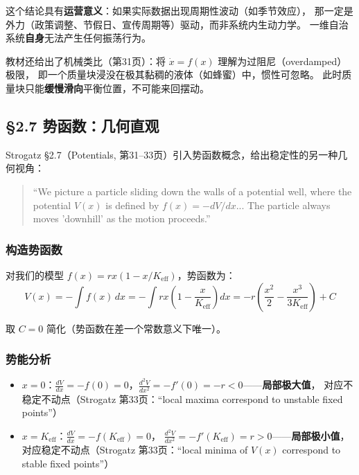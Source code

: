 \documentclass[12pt,a4paper]{article}
\begin{document}
这个结论具有\textbf{运营意义}：如果实际数据出现周期性波动（如季节效应），
那一定是外力（政策调整、节假日、宣传周期等）驱动，而非系统内生动力学。
一维自治系统\textbf{自身}无法产生任何振荡行为。

教材还给出了机械类比（第31页）：将 $\dot{x} = f(x)$ 理解为过阻尼（overdamped）极限，
即一个质量块浸没在极其黏稠的液体（如蜂蜜）中，惯性可忽略。
此时质量块只能\textbf{缓慢滑向}平衡位置，不可能来回摆动。

\subsection{\S2.7 势函数：几何直观}

Strogatz \S2.7（Potentials, 第31--33页）引入势函数概念，给出稳定性的另一种几何视角：

\begin{quote}
\small
``We picture a particle sliding down the walls of a potential well, where the potential $V(x)$
is defined by $f(x) = -dV/dx$... The particle always moves 'downhill' as the motion proceeds.''
\end{quote}

\subsubsection{构造势函数}
对我们的模型 $f(x) = r x(1 - x/K_{\text{eff}})$，势函数为：
\begin{equation}
V(x) = -\int f(x)\,dx
      = -\int r x\left(1 - \frac{x}{K_{\text{eff}}}\right) dx
      = -r\left(\frac{x^2}{2} - \frac{x^3}{3K_{\text{eff}}}\right) + C
\end{equation}

取 $C = 0$ 简化（势函数在差一个常数意义下唯一）。

\subsubsection{势能分析}
\begin{itemize}
  \item $x = 0$：$\frac{dV}{dx} = -f(0) = 0$，$\frac{d^2V}{dx^2} = -f'(0) = -r < 0$——\textbf{局部极大值}，
        对应不稳定不动点（Strogatz 第33页：``local maxima correspond to unstable fixed points''）
  \item $x = K_{\text{eff}}$：$\frac{dV}{dx} = -f(K_{\text{eff}}) = 0$，
        $\frac{d^2V}{dx^2} = -f'(K_{\text{eff}}) = r > 0$——\textbf{局部极小值}，
        对应稳定不动点（Strogatz 第33页：``local minima of $V(x)$ correspond to stable fixed points''）
\end{itemize}
\end{document}
